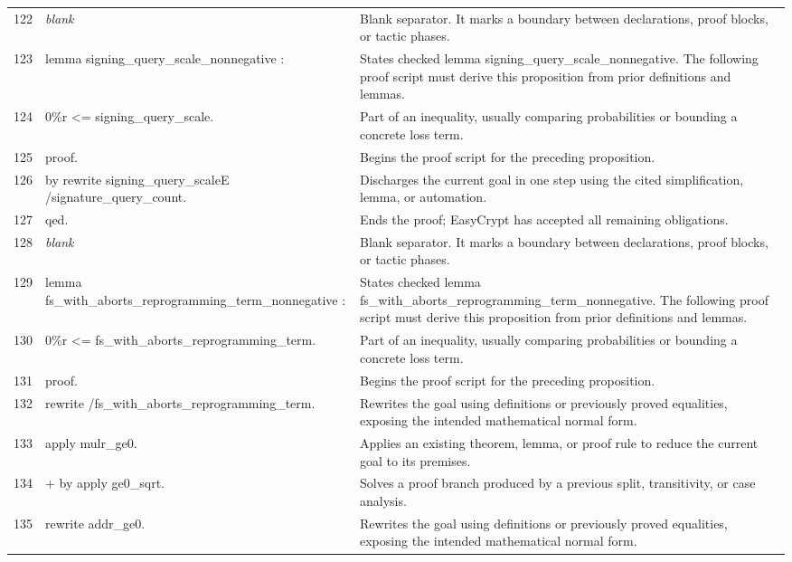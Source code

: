 \documentclass[10pt]{article}
\begin{document}
\begin{longtable}{r L{0.53\textwidth} L{0.37\textwidth}}
122 & {\ttfamily\scriptsize \emph{blank}} & Blank separator.  It marks a boundary between declarations, proof blocks, or tactic phases. \\
123 & {\ttfamily\scriptsize lemma signing\_query\_scale\_nonnegative :} & States checked lemma signing\_query\_scale\_nonnegative.  The following proof script must derive this proposition from prior definitions and lemmas. \\
124 & {\ttfamily\scriptsize   0\%r <= signing\_query\_scale.} & Part of an inequality, usually comparing probabilities or bounding a concrete loss term. \\
125 & {\ttfamily\scriptsize proof.} & Begins the proof script for the preceding proposition. \\
126 & {\ttfamily\scriptsize by rewrite signing\_query\_scaleE /signature\_query\_count.} & Discharges the current goal in one step using the cited simplification, lemma, or automation. \\
127 & {\ttfamily\scriptsize qed.} & Ends the proof; EasyCrypt has accepted all remaining obligations. \\
128 & {\ttfamily\scriptsize \emph{blank}} & Blank separator.  It marks a boundary between declarations, proof blocks, or tactic phases. \\
129 & {\ttfamily\scriptsize lemma fs\_with\_aborts\_reprogramming\_term\_nonnegative :} & States checked lemma fs\_with\_aborts\_reprogramming\_term\_nonnegative.  The following proof script must derive this proposition from prior definitions and lemmas. \\
130 & {\ttfamily\scriptsize   0\%r <= fs\_with\_aborts\_reprogramming\_term.} & Part of an inequality, usually comparing probabilities or bounding a concrete loss term. \\
131 & {\ttfamily\scriptsize proof.} & Begins the proof script for the preceding proposition. \\
132 & {\ttfamily\scriptsize rewrite /fs\_with\_aborts\_reprogramming\_term.} & Rewrites the goal using definitions or previously proved equalities, exposing the intended mathematical normal form. \\
133 & {\ttfamily\scriptsize apply mulr\_ge0.} & Applies an existing theorem, lemma, or proof rule to reduce the current goal to its premises. \\
134 & {\ttfamily\scriptsize + by apply ge0\_sqrt.} & Solves a proof branch produced by a previous split, transitivity, or case analysis. \\
135 & {\ttfamily\scriptsize rewrite addr\_ge0.} & Rewrites the goal using definitions or previously proved equalities, exposing the intended mathematical normal form. \\

\end{longtable}
\end{document}
